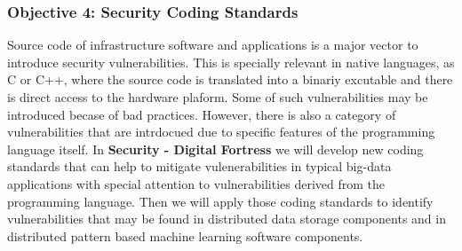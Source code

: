\documentclass[a4paper,11pt]{article}
\newcommand{\project}[1]{\textbf{#1}\xspace}
\newcommand{\SECURITY}{\project{Security - Digital Fortress}}
\newcommand{\TheProject}{\SECURITY}
\begin{document}

\subsubsection*{Objective 4: Security Coding Standards}
Source code of infrastructure software and applications is a major vector to introduce security vulnerabilities. This is specially relevant in native languages, as C or C++, where the source code is translated into a binariy excutable and there is direct access to the hardware plaform. Some of such vulnerabilities may be introduced becase of bad practices. However, there is also a category of vulnerabilities that are intrdocued due to specific features of the programming language itself.
In \TheProject{} we will develop new coding standards that can help to mitigate vulenerabilities in typical big-data applications with special attention to vulnerabilities derived from  the programming language. Then we will apply those coding standards to identify vulnerabilities that may be found in distributed data storage components and in distributed pattern based machine learning software components.
\end{document}
